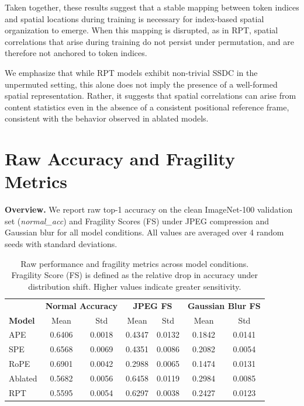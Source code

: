 \documentclass{article}
\begin{document}
    Taken together, these results suggest that a stable mapping between token indices and
    spatial locations during training is necessary for index-based spatial organization to
    emerge. When this mapping is disrupted, as in RPT, spatial correlations that arise during
    training do not persist under permutation, and are therefore not anchored to token indices.

    We emphasize that while RPT models exhibit non-trivial SSDC in the unpermuted setting,
    this alone does not imply the presence of a well-formed spatial representation. Rather,
    it suggests that spatial correlations can arise from content statistics even in the absence
    of a consistent positional reference frame, consistent with the behavior observed in
    ablated models.

\section{Raw Accuracy and Fragility Metrics}
  \textbf{Overview.}
  We report raw top-1 accuracy on the clean ImageNet-100 validation set (\emph{normal\_acc}) and Fragility Scores (FS) under JPEG compression and Gaussian blur for all model conditions. All values are averaged over 4 random seeds with standard deviations.

  \begin{table}[H]
  \centering
  \small
  \begin{tabular}{l|cc|cc|cc}
  \toprule
  & \multicolumn{2}{c|}{\textbf{Normal Accuracy}} 
  & \multicolumn{2}{c|}{\textbf{JPEG FS}} 
  & \multicolumn{2}{c}{\textbf{Gaussian Blur FS}} \\
  \textbf{Model} & Mean & Std & Mean & Std & Mean & Std \\
  \midrule
  APE  & 0.6406 & 0.0018 & 0.4347 & 0.0132 & 0.1842 & 0.0141 \\
  SPE  & 0.6568 & 0.0069 & 0.4351 & 0.0086 & 0.2082 & 0.0054 \\
  RoPE & 0.6901 & 0.0042 & 0.2988 & 0.0065 & 0.1474 & 0.0131 \\
  Ablated & 0.5682 & 0.0056 & 0.6458 & 0.0119 & 0.2984 & 0.0085 \\
  RPT & 0.5595 & 0.0054 & 0.6297 & 0.0038 & 0.2427 & 0.0123 \\
  \bottomrule
  \end{tabular}
  \caption{
  Raw performance and fragility metrics across model conditions. Fragility Score (FS) is defined as the relative drop in accuracy under distribution shift. Higher values indicate greater sensitivity.
  }
  \label{tab:raw_metrics}
  \end{table}
\end{document}
